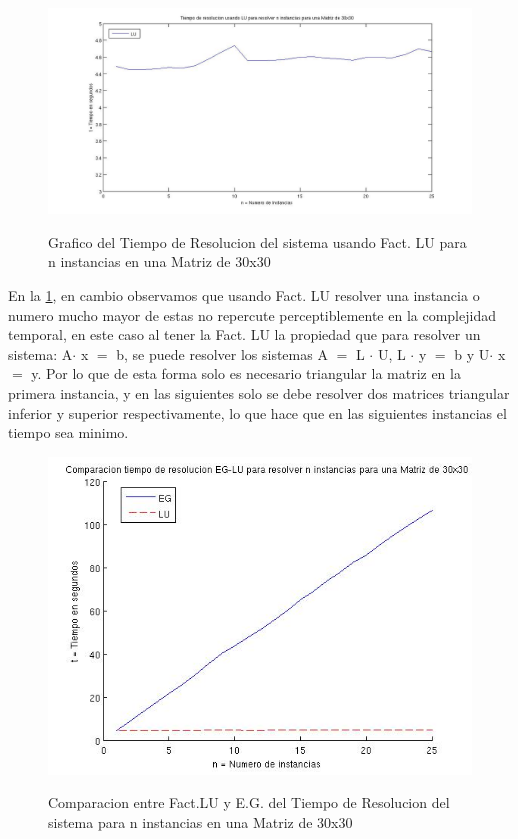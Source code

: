 \documentclass[12pt,a4paper]{article}
\begin{document}
\begin{figure}[h!]
\centering
\caption{Grafico del Tiempo de Resolucion del sistema usando Fact. LU para n instancias en una Matriz de 30x30}
\includegraphics[width=16cm]{tmpPara25InstLU.jpg}
\label{Exp2LU}
\end{figure}
En la \ref{Exp2LU}, en cambio observamos que usando Fact. LU resolver una instancia o numero mucho mayor de estas no repercute perceptiblemente en la complejidad temporal, en este caso al tener la Fact. LU la propiedad que para resolver un sistema:
A$\cdot$ x $=$ b, se puede resolver los sistemas A $=$ L $\cdot$ U, L $\cdot$ y $=$ b y U$\cdot$ x $=$ y.
Por lo que de esta forma solo es necesario triangular la matriz en la primera instancia, y en las siguientes solo se debe resolver dos matrices triangular inferior y superior respectivamente, lo que hace que en las siguientes instancias el tiempo sea minimo. 
\begin{figure}[h!]
\centering
\caption{Comparacion entre Fact.LU y E.G. del Tiempo de Resolucion del sistema para n instancias en una Matriz de 30x30}
\includegraphics[width=12cm]{CompLUEGpara25Inst.jpg}
\label{Exp2Comp}
\end{figure}
\end{document}

